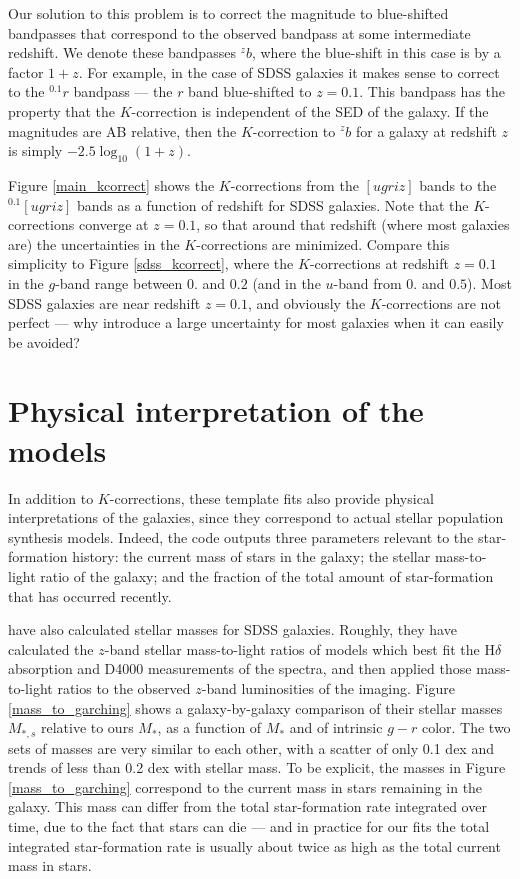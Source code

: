 \documentclass[10pt,preprint]{aastex}
\newcommand{\band}[2]{\ensuremath{^{{#1}}\!{#2}}}
\begin{document}
Our solution to this problem is to correct the magnitude to
blue-shifted bandpasses that correspond to the observed bandpass at
some intermediate redshift. We denote these bandpasses \band{z}{b},
where the blue-shift in this case is by a factor $1+z$. For example,
in the case of SDSS galaxies it makes sense to correct to the
\band{0.1}{r} bandpass --- the $r$ band blue-shifted to $z=0.1$. This
bandpass has the property that the $K$-correction is independent of
the SED of the galaxy. If the magnitudes are AB relative, then the
$K$-correction to \band{z}{b} for a galaxy at redshift $z$ is simply
$-2.5\log_{10} (1+z)$.

Figure \ref{main_kcorrect} shows the $K$-corrections from the
$[ugriz]$ bands to the $\band{0.1}{[ugriz]}$ bands as a function of
redshift for SDSS galaxies. Note that the $K$-corrections converge at
$z=0.1$, so that around that redshift (where most galaxies are) the
uncertainties in the $K$-corrections are minimized. Compare this
simplicity to Figure \ref{sdss_kcorrect}, where the $K$-corrections at
redshift $z=0.1$ in the $g$-band range between $0.$ and $0.2$ (and in
the $u$-band from $0.$ and $0.5$). Most SDSS galaxies are near
redshift $z=0.1$, and obviously the $K$-corrections are not perfect
--- why introduce a large uncertainty for most galaxies when it can
easily be avoided?

\section{Physical interpretation of the models}

In addition to $K$-corrections, these template fits also provide
physical interpretations of the galaxies, since they correspond to
actual stellar population synthesis models. Indeed, the code outputs
three parameters relevant to the star-formation history: the current
mass of stars in the galaxy; the stellar mass-to-light ratio of the
galaxy; and the fraction of the total amount of star-formation that
has occurred recently. 

\citet{kauffmann03a} have also calculated stellar masses for SDSS
galaxies. Roughly, they have calculated the $z$-band stellar
mass-to-light ratios of models which best fit the H$\delta$ absorption
and D4000 measurements of the spectra, and then applied those
mass-to-light ratios to the observed $z$-band luminosities of the
imaging. Figure \ref{mass_to_garching} shows a galaxy-by-galaxy
comparison of their stellar masses $M_{\ast,s}$ relative to ours
$M_\ast$, as a function of $M_\ast$ and of intrinsic $g-r$ color. The
two sets of masses are very similar to each other, with a scatter of
only 0.1 dex and trends of less than 0.2 dex with stellar mass.  To be
explicit, the masses in Figure \ref{mass_to_garching} correspond to
the current mass in stars remaining in the galaxy. This mass can
differ from the total star-formation rate integrated over time, due to
the fact that stars can die --- and in practice for our fits the total
integrated star-formation rate is usually about twice as high as the
total current mass in stars.
\end{document}
